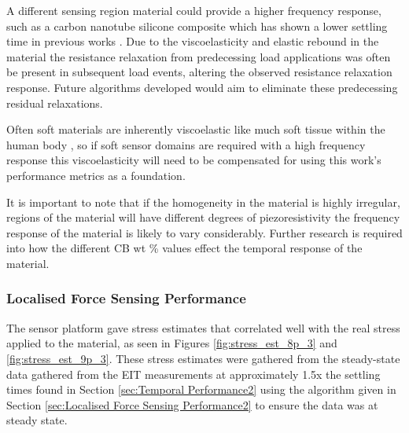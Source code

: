 
A different sensing region material could provide a higher frequency response, such as a carbon nanotube silicone composite which has shown a lower settling time in previous works \citep{Zhao2013,Vidhate2010}. Due to the viscoelasticity and elastic rebound in the material the resistance relaxation from predecessing load applications was often be present in subsequent load events, altering the observed resistance relaxation response. Future algorithms developed would aim to eliminate these predecessing residual relaxations. 

Often soft materials are inherently viscoelastic like much soft tissue within the human body \citep{Landry2021}, so if soft sensor domains are required with a high frequency response this viscoelasticity will need to be compensated for using this work's performance metrics as a foundation.  

It is important to note that if the homogeneity in the material is highly irregular, regions of the material will have different degrees of piezoresistivity the frequency response of the material is likely to vary considerably. Further research is required into how the different CB wt \% values effect the temporal response of the material.


\subsubsection{Localised Force Sensing Performance}\label{sec:Localised Force Sensing Performance3}
The sensor platform gave stress estimates that correlated well with the real stress applied to the material, as seen in Figures \ref{fig:stress_est_8p_3} and \ref{fig:stress_est_9p_3}. These stress estimates were gathered from the steady-state data gathered from the EIT measurements at approximately 1.5x the settling times found in Section \ref{sec:Temporal Performance2} using the algorithm given in Section \ref{sec:Localised Force Sensing Performance2} to ensure the data was at steady state.

